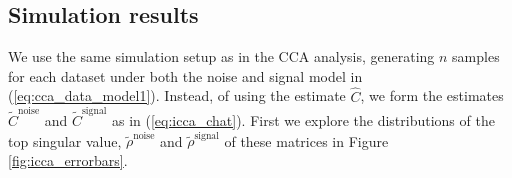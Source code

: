 \subsection{Simulation results}

We use the same simulation setup as in the CCA analysis, generating $n$ samples for each
dataset under both the noise and signal model in (\ref{eq:cca_data_model1}). Instead, of
using the estimate $\widehat{C}$, we form the estimates $\widetilde{C}^{\text{noise}}$ and
$\widetilde{C}^{\text{signal}}$ as in (\ref{eq:icca_chat}). First we explore the
distributions of the top singular value, $\widetilde{\rho}^{\text{noise}}$ and
$\widetilde{\rho}^{\text{signal}}$ of these matrices in Figure \ref{fig:icca_errorbars}.

\begin{figure}[h!]
  \centering
\end{figure}
